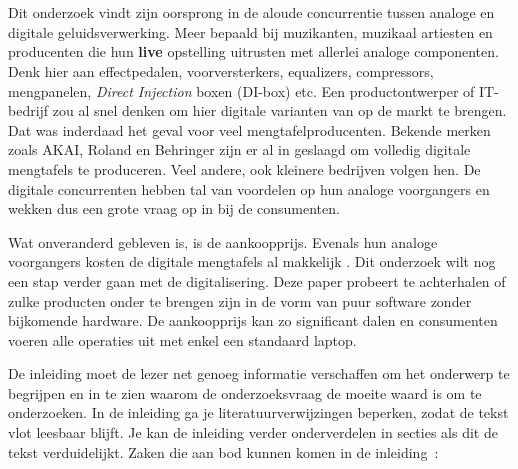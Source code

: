 
\chapter{}
\label{ch:inleiding}

\section{}
\label{sec:probleemstelling}

Dit onderzoek vindt zijn oorsprong in de aloude concurrentie tussen analoge en digitale geluidsverwerking. Meer bepaald bij muzikanten, muzikaal artiesten en producenten die hun \textbf{live} opstelling uitrusten met allerlei analoge componenten. Denk hier aan effectpedalen, voorversterkers, equalizers, compressors, mengpanelen, \textit{Direct Injection} boxen (DI-box) etc. Een productontwerper of IT-bedrijf zou al snel denken om hier digitale varianten van op de markt te brengen. Dat was inderdaad het geval voor veel mengtafelproducenten. Bekende merken zoals AKAI, Roland en Behringer zijn er al in geslaagd om volledig digitale mengtafels te produceren. Veel andere, ook kleinere bedrijven volgen hen. De digitale concurrenten hebben tal van voordelen op hun analoge voorgangers en wekken dus een grote vraag op in bij de consumenten.

Wat onveranderd gebleven is, is de aankoopprijs. Evenals hun analoge voorgangers kosten de digitale mengtafels al makkelijk . Dit onderzoek wilt nog een stap verder gaan met de digitalisering. Deze paper probeert te achterhalen of zulke producten onder te brengen zijn in de vorm van puur software zonder bijkomende hardware. De aankoopprijs kan zo significant dalen en consumenten voeren alle operaties uit met enkel een standaard laptop.

\iffalse
De inleiding moet de lezer net genoeg informatie verschaffen om het onderwerp te begrijpen en in te zien waarom de onderzoeksvraag de moeite waard is om te onderzoeken. In de inleiding ga je literatuurverwijzingen beperken, zodat de tekst vlot leesbaar blijft. Je kan de inleiding verder onderverdelen in secties als dit de tekst verduidelijkt. Zaken die aan bod kunnen komen in de inleiding~\autocite{Pollefliet2011}:


